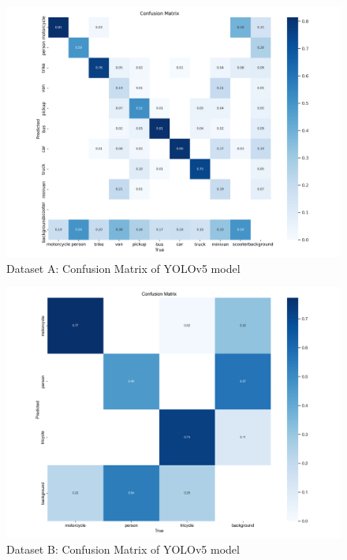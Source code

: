 \documentclass[12pt]{report} %
\begin{document}
		\begin{figure}[ht]
			\centering
			\includegraphics[width=1\columnwidth]{Figures/dataset_a/a_confusion_matrix.png}
			\caption{Dataset A: Confusion Matrix of YOLOv5 model}
			\label{fig:ukDatasetYolov5LargeWeight}
		\end{figure}

		\begin{figure}[hb]
			\centering
			\includegraphics[width=0.95\columnwidth]{Figures/dataset_b/b_confusion_matrix.png}
			\caption{Dataset B: Confusion Matrix of YOLOv5 model}
			\label{fig:mtpDatasetYolov5LargeWeight}
		\end{figure}
\end{document}
